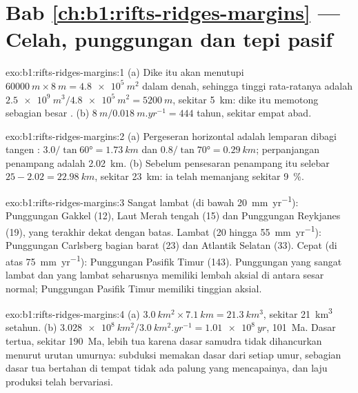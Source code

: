 \section*{Bab \ref{ch:b1:rifts-ridges-margins} --- Celah, punggungan dan tepi pasif}

\begin{solution}{exo:b1:rifts-ridges-margins:1}
(a) Dike itu akan menutupi $\qty{60000}{m}\times\qty{8}{m} = \qty{4.8e5}{m^2}$ dalam denah,
sehingga tinggi rata-ratanya adalah $\qty{2.5e9}{m^3}/\qty{4.8e5}{m^2} =
\qty{5200}{m}$, sekitar \qty{5}{km}: dike itu memotong sebagian besar .
(b) $\qty{8}{m}/\qty{0.018}{m.yr^{-1}} = 444$ tahun, sekitar empat abad.
\end{solution}

\begin{solution}{exo:b1:rifts-ridges-margins:2}
(a) Pergeseran horizontal adalah lemparan dibagi tangen :
$3.0/\tan\ang{60} = \qty{1.73}{km}$ dan $0.8/\tan\ang{70} = \qty{0.29}{km}$;
perpanjangan penampang adalah \qty{2.02}{km}. (b) Sebelum pensesaran penampang itu
selebar $25 - 2.02 = \qty{22.98}{km}$, sekitar \qty{23}{km}: ia telah memanjang sekitar
\qty{9}{\percent}.
\end{solution}

\begin{solution}{exo:b1:rifts-ridges-margins:3}
Sangat lambat (di bawah \qty{20}{mm.yr^{-1}}): Punggungan Gakkel (12), Laut Merah tengah
(15) dan Punggungan Reykjanes (19), yang terakhir dekat dengan batas. Lambat (20 hingga
\qty{55}{mm.yr^{-1}}): Punggungan Carlsberg bagian barat (23) dan Atlantik Selatan (33).
Cepat (di atas \qty{75}{mm.yr^{-1}}): Punggungan Pasifik Timur (143). Punggungan yang
sangat lambat dan yang lambat seharusnya memiliki lembah aksial di antara sesar normal;
Punggungan Pasifik Timur memiliki tinggian aksial.
\end{solution}

\begin{solution}{exo:b1:rifts-ridges-margins:4}
(a) $\qty{3.0}{km^2}\times\qty{7.1}{km} = \qty{21.3}{km^3}$, sekitar
\qty{21}{km^3} setahun. (b) $\qty{3.028e8}{km^2}/\qty{3.0}{km^2.yr^{-1}} =
\qty{1.01e8}{yr}$, \qty{101}{Ma}. Dasar tertua, sekitar \qty{190}{Ma}, lebih tua karena
dasar samudra tidak dihancurkan menurut urutan umurnya: subduksi memakan dasar dari setiap
umur, sebagian dasar tua bertahan di tempat tidak ada palung yang mencapainya, dan laju
produksi telah bervariasi.
\end{solution}

